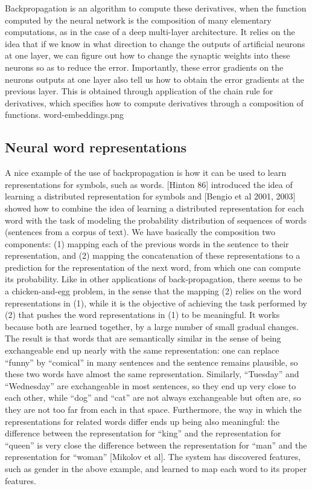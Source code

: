 \documentclass{article} %
\begin{document}
Backpropagation is an algorithm to compute these derivatives, when the
function computed by the neural network is the composition of many
elementary computations, as in the case of a deep multi-layer
architecture. It relies on the idea that if we know in what direction to
change the outputs of artificial neurons at one layer, we can figure out
how to change the synaptic weights into these neurons so as to reduce the
error. Importantly, these error gradients on the neurons outputs at one
layer also tell us how to obtain the error gradients at the previous
layer. This is obtained through application of the chain rule for
derivatives, which specifies how to compute derivatives through a
composition of functions.  word-embeddings.png

\subsection{Neural word representations}

A nice example of the use of backpropagation is how it can be used to learn
representations for symbols, such as words. [Hinton 86] introduced the idea
of learning a distributed representation for symbols and [Bengio et al
  2001, 2003] showed how to combine the idea of learning a distributed
representation for each word with the task of modeling the probability
distribution of sequences of words (sentences from a corpus of text). We
have basically the composition two components: (1) mapping each of the
previous words in the sentence to their representation, and (2) mapping the
concatenation of these representations to a prediction for the
representation of the next word, from which one can compute its
probability.  Like in other applications of back-propagation, there seems
to be a chicken-and-egg problem, in the sense that the mapping (2) relies
on the word representations in (1), while it is the objective of achieving
the task performed by (2) that pushes the word representations in (1) to be
meaningful. It works because both are learned together, by a large number
of small gradual changes. The result is that words that are semantically
similar in the sense of being exchangeable end up nearly with the same
representation: one can replace “funny” by “comical” in many sentences and
the sentence remains plausible, so these two words have almost the same
representation. Similarly, “Tuesday” and “Wednesday” are exchangeable in
most sentences, so they end up very close to each other, while “dog” and
“cat” are not always exchangeable but often are, so they are not too far
from each in that space. Furthermore, the way in which the representations
for related words differ ends up being also meaningful: the difference
between the representation for “king” and the representation for “queen” is
very close the difference between the representation for “man” and the
representation for “woman” [Mikolov et al]. The system has discovered
features, such as gender in the above example, and learned to map each word
to its proper features.
\end{document}

